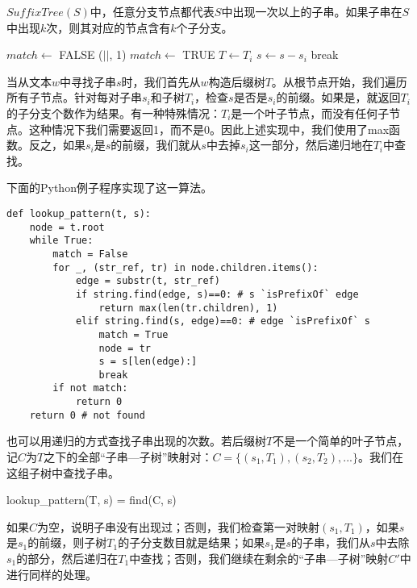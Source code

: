 \documentclass{ctexart}
\begin{document}
$SuffixTree(S)$中，任意分支节点都代表$S$中出现一次以上的子串。如果子串在$S$中出现$k$次，则其对应的节点含有$k$个子分支\cite{ukkonen-lec}。

\begin{algorithmic}[1]
  \Loop
    \State $match \gets$ FALSE
        \State \Return {}($|$$|$, 1)
        \State $match \gets$ TRUE
        \State $T \gets T_i$
        \State $s \gets s - s_i$
        \State break
      \EndIf
    \EndFor
      \State {}
    \EndIf
  \EndLoop
\EndFunction
\end{algorithmic}

当从文本$w$中寻找子串$s$时，我们首先从$w$构造后缀树$T$。从根节点开始，我们遍历所有子节点。针对每对子串$s_i$和子树$T_i$，检查$s$是否是$s_i$的前缀。如果是，就返回$T_i$的子分支个数作为结果。有一种特殊情况：$T_i$是一个叶子节点，而没有任何子节点。这种情况下我们需要返回1，而不是0。因此上述实现中，我们使用了max函数。反之，如果$s_i$是$s$的前缀，我们就从$s$中去掉$s_i$这一部分，然后递归地在$T_i$中查找。

下面的Python例子程序实现了这一算法。

\lstset{language=Python}
\begin{lstlisting}
def lookup_pattern(t, s):
    node = t.root
    while True:
        match = False
        for _, (str_ref, tr) in node.children.items():
            edge = substr(t, str_ref)
            if string.find(edge, s)==0: # s `isPrefixOf` edge
                return max(len(tr.children), 1)
            elif string.find(s, edge)==0: # edge `isPrefixOf` s
                match = True
                node = tr
                s = s[len(edge):]
                break
        if not match:
            return 0
    return 0 # not found
\end{lstlisting}

也可以用递归的方式查找子串出现的次数。若后缀树$T$不是一个简单的叶子节点，记$C$为$T$之下的全部“子串—子树”映射对：$C = \{(s_1, T_1), (s_2, T_2), ...\}$。我们在这组子树中查找子串。

\be
lookup_{pattern}(T, s) = find(C, s)
\ee

如果$C$为空，说明子串没有出现过；否则，我们检查第一对映射$(s_1, T_1)$，如果$s$是$s_1$的前缀，则子树$T_1$的子分支数目就是结果；如果$s_1$是$s$的子串，我们从$s$中去除$s_1$的部分，然后递归在$T_1$中查找；否则，我们继续在剩余的“子串—子树”映射$C'$中进行同样的处理。
\end{document}
